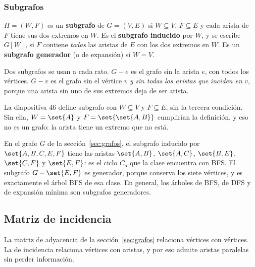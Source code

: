 \documentclass[11pt,letterpaper]{article}
\begin{document}
\subsubsection*{Subgrafos}

\begin{definicion}[Subgrafo]
  \label{def:subgrafo}
  $H = (W, F)$ es un \textbf{subgrafo} de $G = (V, E)$ si
  $W \subseteq V$, $F \subseteq E$ y cada arista de $F$ tiene sus dos
  extremos en $W$. Es el \textbf{subgrafo inducido} por $W$, y se
  escribe $G[W]$, si $F$ contiene \emph{todas} las aristas de $E$ con
  los dos extremos en $W$. Es un \textbf{subgrafo generador} (o de
  expansión) si $W = V$.
\end{definicion}

Dos subgrafos se usan a cada rato. $G - e$ es el grafo sin la arista
$e$, con todos los vértices. $G - v$ es el grafo sin el vértice $v$
\emph{y sin todas las aristas que inciden en $v$}, porque una arista
sin uno de sus extremos deja de ser arista.

\begin{ojo}
  La diapositiva 46 define subgrafo con $W \subseteq V$ y
  $F \subseteq E$, sin la tercera condición. Sin ella, $W = \set{A}$ y
  $F = \set{\set{A, B}}$ cumplirían la definición, y eso no es un
  grafo: la arista tiene un extremo que no está.
\end{ojo}

\begin{ejemplo}
  En el grafo $G$ de la sección~\ref{sec:grafos}, el subgrafo inducido
  por $\set{A, B, C, E, F}$ tiene las aristas $\set{A,B}$,
  $\set{A,C}$, $\set{B,E}$, $\set{C,F}$ y $\set{E,F}$: es el ciclo
  $C_5$ que la clase encuentra con BFS. El subgrafo $G - \set{E, F}$
  es generador, porque conserva los siete vértices, y es exactamente el
  árbol BFS de esa clase. En general, los árboles de BFS, de DFS y de
  expansión mínima son subgrafos generadores.
\end{ejemplo}


\subsection*{Matriz de incidencia}

La matriz de adyacencia de la sección~\ref{sec:grafos} relaciona
vértices con vértices. La de incidencia relaciona vértices con
aristas, y por eso admite aristas paralelas sin perder información.
\end{document}
